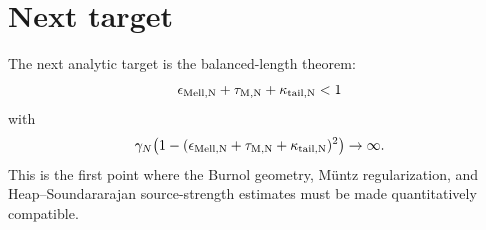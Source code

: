 \documentclass[11pt]{article}
\begin{document}
\section{Next target}
The next analytic target is the balanced-length theorem:
\[
  \epsilon_{\rm Mell,N}+\tau_{\rm M,N}+\kappa_{\rm tail,N}<1
\]
with
\[
  \gamma_N\bigl(1-(\epsilon_{\rm Mell,N}+\tau_{\rm M,N}+\kappa_{\rm tail,N})^2\bigr)\to\infty.
\]
This is the first point where the Burnol geometry, M\"untz regularization, and Heap--Soundararajan source-strength estimates must be made quantitatively compatible.
\end{document}

